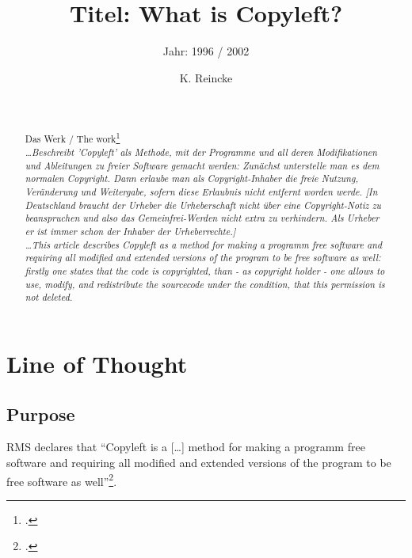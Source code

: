 \documentclass[DIV=calc,BCOR=5mm,11pt,headings=small,oneside,abstract=true, toc=bib]{scrartcl}
\begin{document}

\titlehead{Literaturexzerpt}
\subject{Autor(en): Stallman / Stallman1996c }
\title{Titel: What is Copyleft?}
\subtitle{Jahr: 1996 / 2002 }
\author{K. Reincke}

\maketitle

\begin{abstract}
\noindent
\cite[(in:)][]{StaGay2002a} \\
\noindent
\cite[(ist:)][]{Stallman1996c} \\
Das Werk / The work\footcite[][]{Stallman1996c} \\
\noindent \itshape
\ldots  Beschreibt 'Copyleft' als Methode, mit der Programme und all deren
Modifikationen und Ableitungen zu freier Software gemacht werden: Zunächst
unterstelle man es dem normalen Copyright. Dann erlaube man als
Copyright-Inhaber die freie Nutzung, Veränderung und Weitergabe, sofern diese
Erlaubnis nicht entfernt worden werde. [In Deutschland braucht der Urheber die
Urheberschaft nicht über eine Copyright-Notiz zu beanspruchen und also das
Gemeinfrei-Werden nicht extra zu verhindern. Als Urheber er ist immer schon der
Inhaber der Urheberrechte.]
\\
\noindent
\ldots This article describes Copyleft as a method for making a programm free
software and requiring all modified and extended versions of the program to be
free software as well: firstly one states that the code is copyrighted, than -
as copyright holder - one allows to use, modify, and redistribute the sourcecode
under the condition, that this permission is not deleted.
\end{abstract}
\footnotesize
\normalsize

\section{Line of Thought}

\subsection{Purpose}
RMS declares that \enquote{Copyleft is a [\ldots] method for making a programm
free software and requiring all modified and extended versions of the program to
be free software as well}\footcite[cf][89]{Stallman1996c}.
\end{document}
